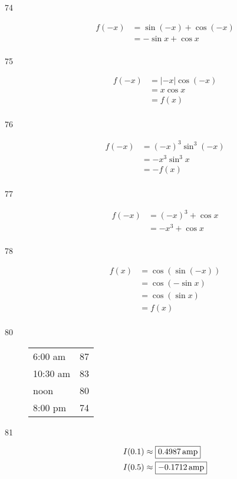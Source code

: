 \documentclass{exam}
\begin{document}
\begin{description}

      \item[74]
        \begin{align*}
          f(-x) & = \sin (-x) + \cos (-x) \\
                & = - \sin x + \cos x \\
        \end{align*}


      \item[75]
        \begin{align*}
          f(-x) & = | -x | \cos (-x) \\
                & = x \cos x \\
                & = f(x) \\
        \end{align*}

      \item[76]
        \begin{align*}
          f(-x) & = (-x)^3 \sin^3 (-x) \\
                & = - x^3 \sin^3 x \\
                & = - f(x) \\
        \end{align*}

      \item[77]
        \begin{align*}
          f(-x) & = (-x)^3 + \cos x \\
                & = - x^3 + \cos x \\
        \end{align*}

      \item[78]
        \begin{align*}
          f(x) & = \cos (\sin (-x)) \\
               & = \cos (- \sin x) \\
               & = \cos (\sin x) \\
               & = f(x) \\
        \end{align*}

      \item[80]
        \begin{tabular}[H]{lr}
          \toprule
          6:00 am  & 87 \\
          10:30 am & 83 \\
          noon     & 80 \\
          8:00 pm  & 74 \\
          \bottomrule
        \end{tabular}

      \item[81]
        \begin{align*}
          I(0.1) & \approx \boxed{ \unit[0.4987]{amp} } \\
          I(0.5) & \approx \boxed{ \unit[-0.1712]{amp} } \\
        \end{align*}
    \end{description}
\end{document}
